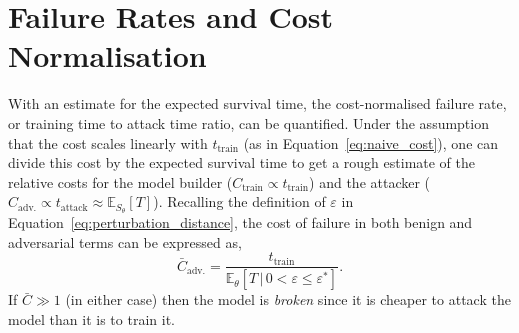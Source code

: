 \section{Failure Rates and Cost Normalisation}
\label{cost_normalization}

With an estimate for the expected survival time, the cost-normalised failure rate, or training time to attack time ratio, can be quantified. Under the assumption that the cost scales linearly with $t_{\mathrm{train}}$ (as in Equation~\ref{eq:naive_cost}), one can divide this cost by the expected survival time to get a rough estimate of the relative costs for the model builder ($C_{\mathrm{train}} \propto t_{\mathrm{train}}$) and the attacker ($C_{\mathrm{adv.}} \propto t_{\mathrm{attack}} \approx \mathbb{E}_{S_\theta}[T]$). Recalling the definition of $\varepsilon$ in Equation~\ref{eq:perturbation_distance}, the cost of failure in both benign and adversarial terms can be expressed as,
\begin{equation}
	\bar{C}_{\mathrm{adv.}}=\frac{t_{\mathrm{train}}}{\mathbb{E}_{\theta}[T \,|\, 0 < \varepsilon \leq \varepsilon^*]}.
	\label{eq:cost}
\end{equation}
If $\bar{C} \gg 1$ (in either case) then the model is \textit{broken} since it is cheaper to attack the model than it is to train it. 



